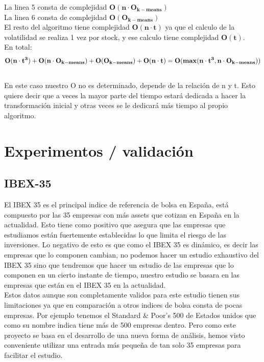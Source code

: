 \documentclass[12pt,a4paper]{article}
\begin{document}
	La linea 5 consta de complejidad $\mathbf{O(n \cdot O_{k-means})}$\\
	La linea 6 consta de complejidad $\mathbf{O(O_{k-means})}$\\
	 El resto del algoritmo tiene complejidad $\mathbf{O(n\cdot t)}$ ya que el calculo de la volatilidad se realiza 1 vez por stock, y ese calculo tiene complejidad $\mathbf{O(t)}$.\\
	 En total: \[\mathbf{O(n \cdot t^3) + O(n \cdot O_{k-means}) + O(O_{k-means}) + O(n \cdot t) \\= O(max(n \cdot t^3,n \cdot O_{k-means})) }\]\\
	 En este caso nuestro O no es determinado, depende de la relación de n y t. Esto quiere decir que a veces la mayor parte del tiempo estará dedicada a hacer la transformación inicial y otras veces se le dedicará más tiempo al propio algoritmo.
\pagebreak


	\section{Experimentos / validación}
	
		\subsection{IBEX-35}
		El IBEX 35 es el principal indice de referencia de bolsa en España, está compuesto por las 35 empresas con más assets que cotizan en España en la actualidad. Esto tiene como positivo que asegura que las empresas que estudiamos están fuertemente establecidas lo que limita el riesgo de las inversiones. Lo negativo de esto es que como el IBEX 35 es dinámico, es decir las empresas que lo componen cambian, no podemos hacer un estudio exhaustivo del IBEX 35 sino que tendremos que hacer un estudio de las empresas que lo componen en un cierto instante de tiempo, nuestro estudio se basara en las empresas que están en el IBEX 35 en la actualidad.\\
		
		Estos datos aunque son completamente validos para este estudio tienen sus limitaciones ya que en comparación a otros indices de bolsa consta de pocas empresas. Por ejemplo tenemos el Standard \& Poor's 500 de Estados unidos que como su nombre indica tiene más de 500 empresas dentro. Pero como este proyecto se basa en el desarrollo de una nueva forma de análisis, hemos visto conveniente utilizar una entrada más pequeña de tan solo 35 empresas para facilitar el estudio.\\
		
\end{document}
